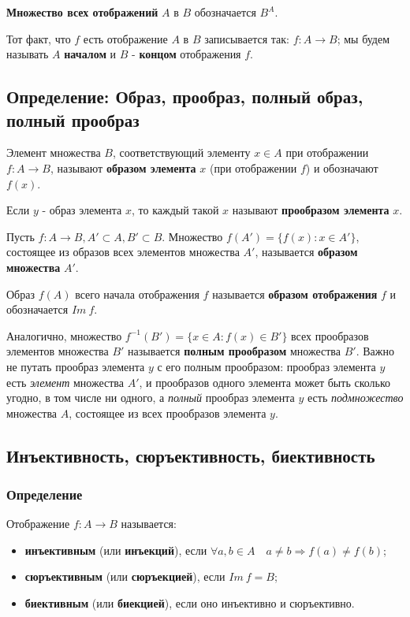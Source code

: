 \documentclass{article}
\begin{document}
\textbf{Множество всех отображений} $A$ в $B$ обозначается $B^A$.

Тот факт, что $f$ есть отображение $A$ в $B$ записывается так: $f: A \rightarrow B$; мы будем называть $A$ \textbf{началом} и $B$ - \textbf{концом} отображения $f$.

\subsection{Определение: Образ, прообраз, полный образ, полный прообраз}
Элемент множества $B$, соответствующий элементу $x \in A$ при отображении $f: A \rightarrow B$, называют \textbf{образом элемента} $x$ (при отображении $f$) и обозначают $f(x)$.

Если $y$ - образ элемента $x$, то каждый такой $x$ называют \textbf{прообразом элемента} $x$.

Пусть $f: A \rightarrow B, A' \subset A, B' \subset B$. Множество $f(A') = \{f(x) : x \in A'\}$, состоящее из образов всех элементов множества $A'$, называется \textbf{образом множества} $A'$.

Образ $f(A)$ всего начала отображения $f$ называется \textbf{образом отображения} $f$ и обозначается $Im~f$.

Аналогично, множество $f^{-1}(B') = \{x \in A : f(x) \in B'\}$ всех прообразов элементов множества $B'$ называется \textbf{полным прообразом} множества $B'$. Важно не путать прообраз элемента $y$ с его полным прообразом: прообраз элемента $y$ есть \textit{элемент} множества $A'$, и прообразов одного элемента может быть сколько угодно, в том числе ни одного, а \textit{полный} прообраз элемента $y$ есть \textit{подмножество} множества $A$, состоящее из всех прообразов элемента $y$.

\subsection{Инъективность, сюръективность, биективность}
\subsubsection*{Определение}
Отображение $f: A \rightarrow B$ называется: \begin{itemize}
	\item \textbf{инъективным} (или \textbf{инъекций}), если $\forall a, b \in A \quad a \neq b \Rightarrow f(a) \neq f(b)$;
	\item \textbf{сюръективным} (или \textbf{сюръекцией}), если $Im~f = B$;
	\item \textbf{биективным} (или \textbf{биекцией}), если оно инъективно и сюръективно.
\end{itemize}
\end{document}
